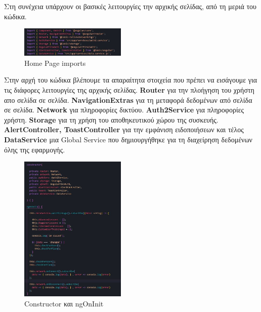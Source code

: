 \documentclass[a4paper,12pt]{article}
\begin{document}
			Στη συνέχεια υπάρχουν οι βασικές λειτουργίες την αρχικής σελίδας, από τη μεριά του κώδικα.
			\vspace*{.5cm}

			\begin{figure}
				\caption{Home Page imports}
				\vspace*{0.5cm}

				\includegraphics[width=0.45\textwidth]{homeImports}	
			\end{figure}
			
			Στην αρχή του κώδικα βλέπουμε τα απαραίτητα στοιχεία που πρέπει να εισάγουμε για τις διάφορες λειτουργίες της αρχικής σελίδας. \textbf{Router} για την πλοήγηση του χρήστη απο σελίδα σε σελίδα. 
			\textbf{NavigationExtras} για τη μεταφορά δεδομένων από σελίδα σε σελίδα.
			\textbf{Network} για πληροφορίες δικτύου. \textbf{Auth2Service} για πληροφορίες χρήστη. \textbf{Storage} για τη χρήση του αποθηκευτικού 
			χώρου της συσκευής. \textbf{AlertController, ToastController} για την εμφάνιση ειδοποιήσεων και τέλος \textbf{DataService} μια Global 
			Service που δημιουργήθηκε για τη διαχείρηση δεδομένων όλης της εφαρμογής.
			\vspace*{1cm}

			\begin{figure}
				\caption{Constructor και ngOnInit}
				\vspace*{0.5cm}

				\includegraphics[width=0.45\textwidth]{homInit}	
			\end{figure}
\end{document}
